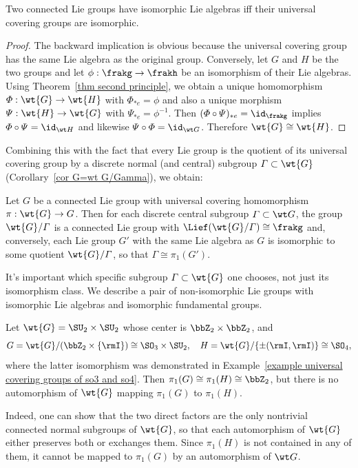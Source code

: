 \begin{thm}[{{\cite[Thm.~9.5.13]{HN}}}]
    Two connected Lie groups have isomorphic Lie algebras iff their universal covering groups are isomorphic.
\end{thm}
\begin{proof}
    The backward implication is obvious because the universal covering group has the same Lie algebra as the original group. Conversely, let $G$ and $H$ be the two groups and let $\phi:\frakg\to \frakh$ be an isomorphism of their Lie algebras. Using Theorem~\ref{thm second principle}, we obtain a unique homomorphism $\varPhi:\wt{G}\to \wt{H}$ with $\varPhi_{\ast e}=\phi$ and also a unique morphism $\varPsi:\wt{H}\to \wt{G}$ with $\varPsi_{\ast e}=\phi^{-1}$. Then $(\varPhi\circ\varPsi)_{\ast e}=\id_{\frakg}$ implies  $\varPhi\circ\varPsi=\id_{\wt H}$ and likewise $\varPsi\circ\varPhi=\id_{\wt G}$. Therefore $\wt{G}\cong \wt{H}$.
\end{proof}
Combining this with the fact that every Lie group is the quotient of its universal covering group by a discrete normal (and central) subgroup $\varGamma\subset \wt{G}$ (Corollary~\ref{cor G=wt G/Gamma}), we obtain:

\begin{cor}
    Let $G$ be a connected Lie group with universal covering homomorphism $\pi:\wt{G}\to G$. Then for each discrete central subgroup $\varGamma\subset \wt G$, the group $\wt{G}\slash\varGamma$ is a connected Lie group with $\Lief (\wt{G}\slash \varGamma)\cong \frakg$  and, conversely, each Lie group $G'$ with the same Lie algebra as $G$ is isomorphic to some quotient $\wt{G}\slash \varGamma$, so that $\varGamma\cong \pi_1(G')$.
\end{cor}

\begin{example}
    It's important which specific subgroup $\varGamma\subset \wt{G}$ one chooses, not just its isomorphism class.
    We describe a pair of non-isomorphic Lie groups with isomorphic Lie algebras and isomorphic fundamental groups.

    Let $\wt{G}=\SU_2\times \SU_2$ whose center is $\bbZ_2\times\bbZ_2$, and 
    \[G=\wt{G}\slash (\bbZ_2\times \{\rmI\})\cong \SO_3\times \SU_2,\quad H=\wt{G}\slash \{\pm (\rmI,\rmI)\}\cong \SO_4,\]
    where the latter isomorphism was demonstrated in Example~\ref{example universal covering groups of so3 and so4}. Then $\pi_1(G)\cong \pi_1(H)\cong \bbZ_2$, but there is no automorphism of $\wt{G}$ mapping $\pi_1(G)$ to $\pi_1(H)$.

    Indeed, one can show that the two direct factors are the only nontrivial connected normal subgroups of $\wt{G}$, so that each automorphism of $\wt{G}$ either preserves both or exchanges them. Since $\pi_1(H)$ is not contained in any of them, it cannot be mapped to $\pi_1(G)$ by an automorphism of $\wt G$.
\end{example}

